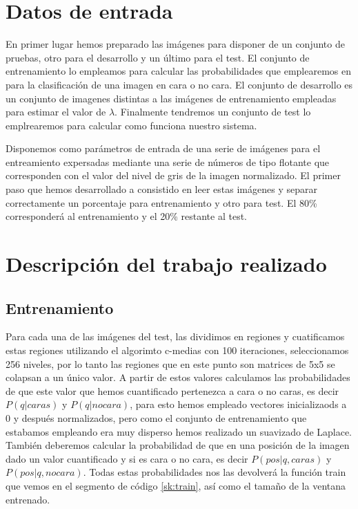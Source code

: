 
\section{ Datos de entrada }

En primer lugar hemos preparado las imágenes para disponer de un conjunto de pruebas, otro para el desarrollo y un último para el test. El conjunto de entrenamiento lo empleamos para calcular las probabilidades que emplearemos en para la clasificación de una imagen en cara o no cara. El conjunto de desarrollo es un conjunto de imagenes distintas a las imágenes de entrenamiento empleadas para estimar el valor de $\lambda$. Finalmente tendremos un conjunto de test lo emplrearemos para calcular como funciona nuestro sistema.\par

Disponemos como parámetros de entrada de una serie de imágenes para el entreamiento expersadas mediante una serie de números de tipo flotante que corresponden con el valor del nivel de gris de la imagen normalizado. El primer paso que hemos desarrollado a consistido en leer estas imágenes y separar correctamente un porcentaje para entrenamiento y otro para test. El 80\% corresponderá al entrenamiento y el 20\% restante al test.\par

\section{Descripción del trabajo realizado}
\subsection {Entrenamiento}
Para cada una de las imágenes del test, las dividimos en regiones y cuatificamos estas regiones utilizando el algorimto c-medias con 100 iteraciones, seleccionamos 256 niveles, por lo tanto las regiones que en este punto son matrices de 5x5 se colapsan a un único valor. A partir de estos valores calculamos las probabilidades de que este valor que hemos cuantificado pertenezca a cara o no caras, es decir $P(q | caras)$ y $P(q | no cara)$, para esto hemos empleado vectores inicializaods a 0 y después normalizados, pero como el conjunto de entrenamiento que estabamos empleando era muy disperso hemos realizado un suavizado de Laplace. También deberemos calcular la probabilidad de que en una posición de la imagen dado un valor cuantificado y si es cara o no cara, es decir  $P(pos|q, caras)$ y $P(pos|q, no cara)$. Todas estas probabilidades nos las devolverá la función train que vemos en el segmento de código \ref{sk:train}, así como el tamaño de la ventana entrenado. 

